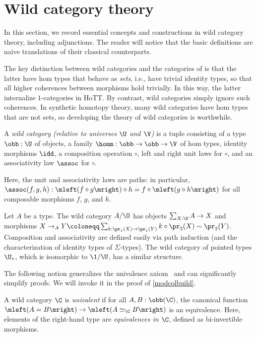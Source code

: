 \section{Wild category theory} \label{wildcats}

In this section, we record essential concepts and constructions in wild category theory, including adjunctions. The reader will notice that the basic definitions are naive translations of their classical counterparts.

The key distinction between wild categories and the categories of \cite[Section 9.1]{Uni13} is that the latter have hom types that behave as \emph{sets}, i.e., have trivial identity types, so that all higher coherences between morphisms hold trivially. In this way, the latter internalize $1$-categories in HoTT. By contrast, wild categories simply ignore such coherences. In synthetic homotopy theory, many wild categories have hom types that are not sets, so developing the theory of wild categories is worthwhile.

\begin{defi}
  A \emph{wild category (relative to universes $\U$ and $\V$)} is a tuple consisting of a type $\obb : \U$ of objects, a family $\homm : \obb \to \obb \to \V$ of hom types, identity morphisms $\idd$, a composition operation $\circ$, left and right unit laws for $\circ$, and an associativity law $\assoc$ for $\circ$.
  
  Here, the unit and associativity laws are paths: in particular, $\assoc(f,g,h) : \mleft(f \circ g\mright) \circ h = f \circ \mleft(g \circ h\mright)$ for all composable morphisms $f$, $g$, and $h$.
\end{defi}

\begin{exa}
Let $A$ be a type. The wild category $A/\U$ has objects $\sum_{X : \U}A \to X$ and morphisms $X \to_A Y \coloneqq \sum_{k : \pr_1(X) \to \pr_1(Y)}k \circ \pr_2(X) \sim \pr_2(Y)$. Composition and associativity are defined easily via path induction (and the characterization of identity types of $\Sigma$-types). The wild category of pointed types $\U_{\ast}$, which is isomorphic to $\1/\U$, has a similar structure.
\end{exa}

The following notion generalizes the univalence axiom~\cite[Axiom 2.10.3]{Uni13} and can significantly simplify proofs. We will invoke it in the proof of \autoref{modcolbuild}.
\begin{defi} \label{unvwc}
  A wild category $\C$ is \emph{univalent} if for all $A , B : \obb(\C)$, the canonical function $\mleft(A = B\mright) \to \mleft(A \simeq_{\C} B\mright)$ is an equivalence. Here, elements of the right-hand type are \emph{equivalences in $\C$}, defined as bi-invertible morphisms.
\end{defi}

